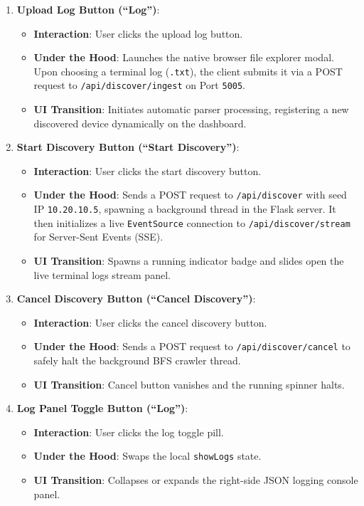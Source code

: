 \documentclass[11pt,a4paper]{article}
\begin{document}
\begin{enumerate}
    \item \textbf{Upload Log Button (``Log'')}:
    \begin{itemize}
        \item \textbf{Interaction}: User clicks the upload log button.
        \item \textbf{Under the Hood}: Launches the native browser file explorer modal. Upon choosing a terminal log (\texttt{.txt}), the client submits it via a POST request to \texttt{/api/discover/ingest} on Port \texttt{5005}.
        \item \textbf{UI Transition}: Initiates automatic parser processing, registering a new discovered device dynamically on the dashboard.
    \end{itemize}
    
    \item \textbf{Start Discovery Button (``Start Discovery'')}:
    \begin{itemize}
        \item \textbf{Interaction}: User clicks the start discovery button.
        \item \textbf{Under the Hood}: Sends a POST request to \texttt{/api/discover} with seed IP \texttt{10.20.10.5}, spawning a background thread in the Flask server. It then initializes a live \texttt{EventSource} connection to \texttt{/api/discover/stream} for Server-Sent Events (SSE).
        \item \textbf{UI Transition}: Spawns a running indicator badge and slides open the live terminal logs stream panel.
    \end{itemize}
    
    \item \textbf{Cancel Discovery Button (``Cancel Discovery'')}:
    \begin{itemize}
        \item \textbf{Interaction}: User clicks the cancel discovery button.
        \item \textbf{Under the Hood}: Sends a POST request to \texttt{/api/discover/cancel} to safely halt the background BFS crawler thread.
        \item \textbf{UI Transition}: Cancel button vanishes and the running spinner halts.
    \end{itemize}
    
    \item \textbf{Log Panel Toggle Button (``Log'')}:
    \begin{itemize}
        \item \textbf{Interaction}: User clicks the log toggle pill.
        \item \textbf{Under the Hood}: Swaps the local \texttt{showLogs} state.
        \item \textbf{UI Transition}: Collapses or expands the right-side JSON logging console panel.
    \end{itemize}
    

\end{enumerate}
\end{document}
